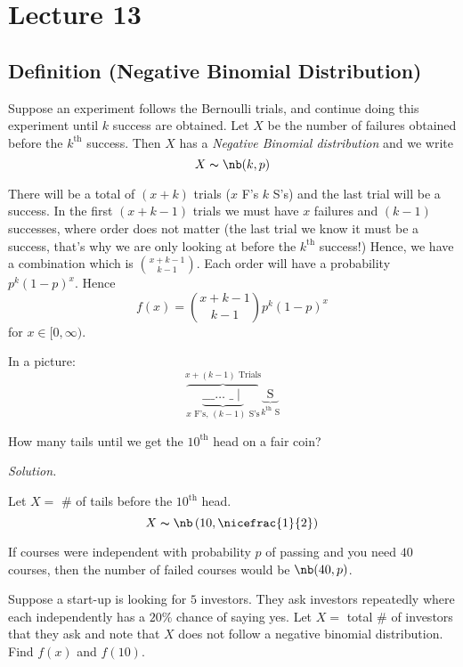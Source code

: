 \section{Lecture 13}

\begin{defbox}
    \subsection{Definition (Negative Binomial Distribution)}
    Suppose an experiment follows the Bernoulli trials, and continue
    doing this experiment until $ k $ success are obtained. Let $ X $
    be the number of failures obtained before the $ k^{\text{th}} $
    success. Then $ X $ has a \emph{Negative Binomial distribution}
    and we write
    \[ X \thicksim \nb(k,p) \]
\end{defbox}


There will be a total of $ (x+k) $ trials ($ x $ F's $ k $ S's)
and the last trial will be a success. In the first $ (x+k-1) $ trials
we must have $ x $ failures and $ (k-1) $ successes, where order does not matter
(the last trial we know it must be a success, that's why we are only looking at
before the $ k^{\text{th}} $ success!)
Hence, we have a combination which is $ \binom{x+k-1}{k-1} $. Each order
will have a probability $ p^k(1-p)^x $. Hence
\[ f(x)=\binom{x+k-1}{k-1}p^k(1-p)^x \]
for $ x\in[0,\infty) $.

In a picture:
\[\overbrace{
    \underbrace{
        \text{\_ \_ \_ $\ldots$ \_}\mid}
        _{x \text{ F's},\,(k-1) \text{ S's}}}^{x+(k-1)\text{ Trials}}
\underbrace{ \text{ S } }_{ k^{\text{th}} \text{ S}} \]


How many tails until we get the $10^{\text{th}}$ head on a fair coin?

\emph{Solution.}

Let $ X= $ \# of tails before the $ 10^{\text{th}} $ head.
\[ X\thicksim\nb\left(10,\nicefrac{1}{2}\right) \]


If courses were independent with probability $ p $ of passing
and you need $ 40 $ courses, then the number of failed courses
would be $ \nb(40,p) $.


Suppose a start-up is looking for $ 5 $ investors. They ask
investors repeatedly where each independently has a $ 20\% $ chance
of saying yes. Let $ X= $ total \# of investors that they ask and
note that $ X $ does not follow a negative binomial distribution.
Find $ f(x) $ and $ f(10) $.

